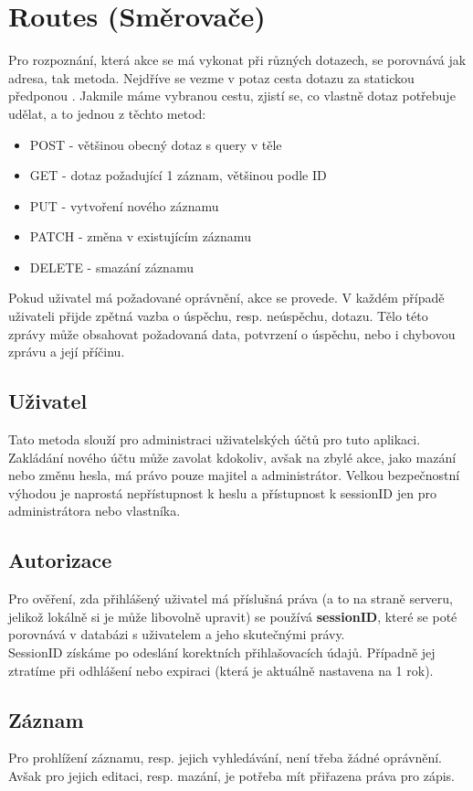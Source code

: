 \section[Routes]{Routes (Směrovače)}
Pro rozpoznání, která akce se má vykonat při různých dotazech, se porovnává
jak adresa, tak metoda. Nejdříve se vezme v potaz cesta dotazu za
statickou předponou .
Jakmile máme vybranou cestu, zjistí se, co vlastně dotaz potřebuje udělat, a to jednou z těchto metod:
\begin{itemize}
     \item POST - většinou obecný dotaz s query v těle
     \item GET - dotaz požadující 1 záznam, většinou podle ID
     \item PUT - vytvoření nového záznamu
     \item PATCH - změna v existujícím záznamu
     \item DELETE - smazání záznamu
\end{itemize}
Pokud uživatel má požadované oprávnění, akce se provede. V každém případě
uživateli přijde zpětná vazba o úspěchu, resp. neúspěchu, dotazu. Tělo
této zprávy může obsahovat požadovaná data, potvrzení o úspěchu, nebo i
chybovou zprávu a její příčinu.


\subsection{Uživatel}
Tato metoda slouží pro administraci uživatelských účtů pro tuto aplikaci.
Zakládání nového účtu může zavolat kdokoliv, avšak na zbylé akce, jako
mazání nebo změnu hesla, má právo pouze majitel a administrátor.
Velkou bezpečnostní výhodou je naprostá nepřístupnost k heslu a
přístupnost k sessionID jen pro administrátora nebo vlastníka.

\subsection{Autorizace}
Pro ověření, zda přihlášený uživatel má příslušná práva
(a to na straně serveru, jelikož lokálně si je může libovolně upravit) se používá
\textbf{sessionID}, které se poté porovnává v databázi s uživatelem a jeho skutečnými právy.\\
SessionID získáme po odeslání korektních přihlašovacích údajů.
Případně jej ztratíme při odhlášení nebo
expiraci (která je aktuálně nastavena na 1 rok).

\subsection{Záznam}
Pro prohlížení záznamu, resp. jejich vyhledávání, není třeba žádné oprávnění.
Avšak pro jejich editaci, resp. mazání,
je potřeba mít přiřazena práva pro zápis.

